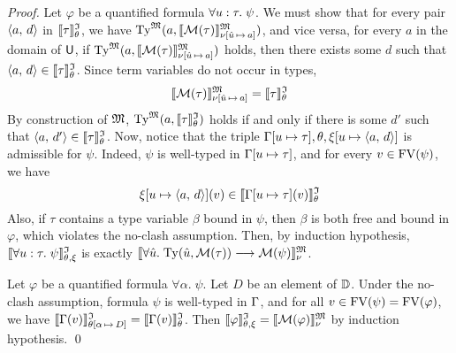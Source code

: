 \begin{proof}
Let $\varphi$ be a quantified formula $\forall u \mathrel{:} \tau .\; \psi$.
We must show that for every pair $\langle a,\, d \rangle$ in $\llbracket\tau\rrbracket^{\mathfrak{I}}_{\theta}$, we have
$\mathrm{Ty}^{\mathfrak{M}}(a, \llbracket \mathcal{M}(\tau) \rrbracket^{\mathfrak{M}}_{\nu[\hat{u}\,\mapsto\,a]})$,
and vice versa, for every $a$ in the domain of $\mathsf{U}$, if
$\mathrm{Ty}^{\mathfrak{M}}(a, \llbracket \mathcal{M}(\tau) \rrbracket^{\mathfrak{M}}_{\nu[\hat{u}\,\mapsto\,a]})$
holds, then there exists some $d$ such that $\langle a,\, d \rangle \in
\llbracket\tau\rrbracket^{\mathfrak{I}}_{\theta}$.
%
Since term variables do not occur in types,
\[\llbracket \mathcal{M}(\tau) \rrbracket^{\mathfrak{M}}_{\nu[\hat{u}\,\mapsto\,a]} =
\llbracket \tau \rrbracket^{\mathfrak{I}}_\theta\]%
By construction of $\mathfrak{M}$,
$\mathrm{Ty}^{\mathfrak{M}}(a, \llbracket \tau \rrbracket^{\mathfrak{I}}_\theta)$
holds if and only if there is some $d'$ such that
$\langle a,\, d' \rangle \in \llbracket \tau \rrbracket^{\mathfrak{I}}_\theta$.
%
Now, notice that the triple $\mathrm{\Gamma}[u \mapsto \tau],
\theta,\xi[u \mapsto \langle a,\, d \rangle]$ is admissible for $\psi$.
Indeed, $\psi$ is well-typed in $\mathrm{\Gamma}[u \mapsto \tau]$,
and for every $v \in \mathrm{FV}(\psi)$, we have
\[\xi[u \mapsto \langle a,\, d \rangle](v) \in \llbracket\mathrm{\Gamma}[u \mapsto \tau](v)\rrbracket^{\mathfrak{I}}_{\theta}\]%
Also, if $\tau$ contains a type variable $\beta$ bound in $\psi$,
then $\beta$ is both free and bound in $\varphi$, which violates
the no-clash assumption.
%
Then, by induction hypothesis, $\llbracket\forall u \mathrel{:} \tau .\; \psi\rrbracket^{\mathfrak{I}}_{\theta,\xi}$
is exactly $\llbracket \forall \hat{u} .\; \mathrm{Ty}(\hat{u},\mathcal{M}(\tau))
\longrightarrow \mathcal{M}(\psi) \rrbracket^{\mathfrak{M}}_{\nu}$.

Let $\varphi$ be a quantified formula $\forall \alpha .\; \psi$.
Let $D$ be an element of $\mathbb{D}$. Under the no-clash assumption,
formula $\psi$ is well-typed in $\mathrm{\Gamma}$, and for all
$v \in \mathrm{FV}(\psi) = \mathrm{FV}(\varphi)$, we have
$\llbracket\mathrm{\Gamma}(v)\rrbracket^{\mathfrak{I}}_{\theta[\alpha\,\mapsto\,D]} = \llbracket\mathrm{\Gamma}(v)\rrbracket^{\mathfrak{I}}_{\theta}$.
Then $\llbracket\varphi\rrbracket^{\mathfrak{I}}_{\theta,\xi} = \llbracket \mathcal{M}(\varphi) \rrbracket^{\mathfrak{M}}_{\nu}$ by induction hypothesis.
\qed
\end{proof}
